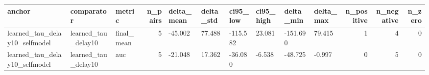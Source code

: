 \begin{tabular}{lllrllllllrrr}
\toprule
anchor & comparator & metric & n_pairs & delta_mean & delta_std & ci95_low & ci95_high & delta_min & delta_max & n_positive & n_negative & n_zero \\
\midrule
learned_tau_delay10_selfmodel & learned_tau_delay10 & final_mean & 5 & -45.002 & 77.488 & -115.582 & 23.081 & -151.690 & 79.415 & 1 & 4 & 0 \\
learned_tau_delay10_selfmodel & learned_tau_delay10 & auc & 5 & -21.048 & 17.362 & -36.080 & -6.538 & -48.725 & -0.997 & 0 & 5 & 0 \\
\bottomrule
\end{tabular}
